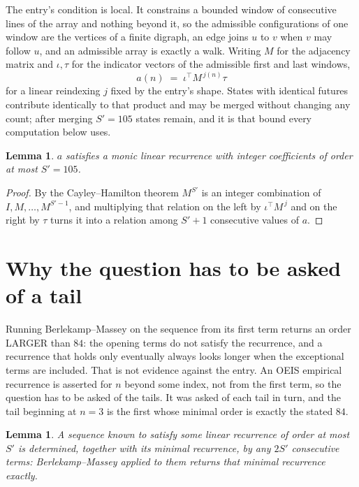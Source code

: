 \documentclass[11pt,a4paper]{article}
\theoremstyle{plain}
\newtheorem{lemma}[theorem]{Lemma}
\theoremstyle{definition}
\begin{document}
The entry's condition is local. It constrains a bounded window of consecutive lines of the
array and nothing beyond it, so the admissible configurations of one window are the vertices of
a finite digraph, an edge joins $u$ to $v$ when $v$ may follow $u$, and an admissible array is
exactly a walk. Writing $M$ for the adjacency matrix and $\iota,\tau$ for the indicator vectors
of the admissible first and last windows,
\[
a(n)\;=\;\iota^{\!\top}M^{\,j(n)}\tau
\]
for a linear reindexing $j$ fixed by the entry's shape. States with identical futures
contribute identically to that product and may be merged without changing any count; after
merging $S'=105$ states remain, and it is that bound every computation below uses.

\begin{lemma}\label{lem:cf}
$a$ satisfies a monic linear recurrence with integer coefficients of order at most $S'=105$.
\end{lemma}

\begin{proof}
By the Cayley--Hamilton theorem $M^{S'}$ is an integer combination of $I,M,\dots,M^{S'-1}$,
and multiplying that relation on the left by $\iota^{\!\top}M^{\,j}$ and on the right by
$\tau$ turns it into a relation among $S'+1$ consecutive values of $a$.
\end{proof}

\section{Why the question has to be asked of a tail}

Running Berlekamp--Massey on the sequence from its first term returns an order LARGER than $84$: the opening terms do not satisfy the recurrence, and a recurrence that holds only eventually always looks longer when the exceptional terms are included. That is not evidence against the entry. An OEIS empirical recurrence is asserted for $n$ beyond some index, not from the first term, so the question has to be asked of the tails. It was asked of each tail in turn, and the tail beginning at $n=3$ is the first whose minimal order is exactly the stated $84$.

\begin{lemma}\label{lem:bm}
A sequence known to satisfy some linear recurrence of order at most $S'$ is determined,
together with its minimal recurrence, by any $2S'$ consecutive terms: Berlekamp--Massey applied
to them returns that minimal recurrence exactly.
\end{lemma}
\end{document}
